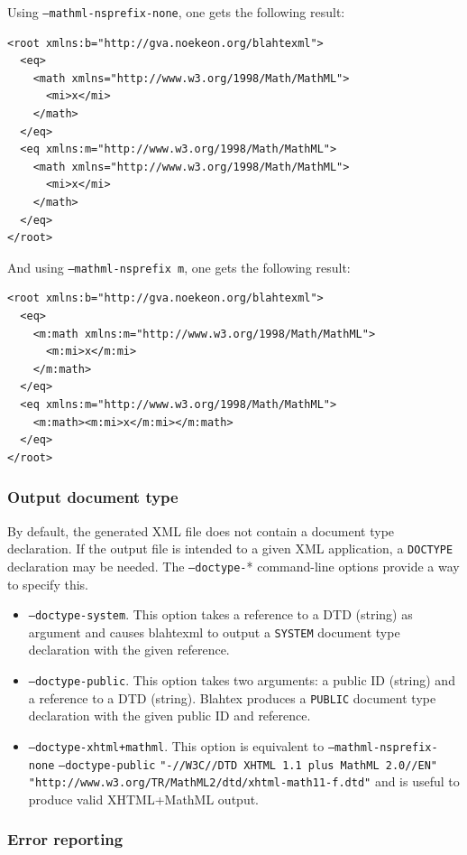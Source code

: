 \documentclass{article}
\begin{document}
Using \texttt{--mathml-nsprefix-none}, one gets the following result:
\begin{verbatim}
<root xmlns:b="http://gva.noekeon.org/blahtexml">
  <eq>
    <math xmlns="http://www.w3.org/1998/Math/MathML">
      <mi>x</mi>
    </math>
  </eq>
  <eq xmlns:m="http://www.w3.org/1998/Math/MathML">
    <math xmlns="http://www.w3.org/1998/Math/MathML">
      <mi>x</mi>
    </math>
  </eq>
</root>
\end{verbatim}

And using \texttt{--mathml-nsprefix m}, one gets the following result:
\begin{verbatim}
<root xmlns:b="http://gva.noekeon.org/blahtexml">
  <eq>
    <m:math xmlns:m="http://www.w3.org/1998/Math/MathML">
      <m:mi>x</m:mi>
    </m:math>
  </eq>
  <eq xmlns:m="http://www.w3.org/1998/Math/MathML">
    <m:math><m:mi>x</m:mi></m:math>
  </eq>
</root>
\end{verbatim}


\subsubsection{Output document type}

By default, the generated XML file does not contain a document type declaration. If the output file is intended to a given XML application, a \texttt{DOCTYPE} declaration may be needed. The \texttt{--doctype-}* command-line options provide a way to specify this.

\begin{itemize}
\item \texttt{--doctype-system}. This option takes a reference to a DTD (string) as argument and causes blahtexml to output a \texttt{SYSTEM} document type declaration with the given reference.
\item \texttt{--doctype-public}. This option takes two arguments: a public ID (string) and a reference to a DTD (string). Blahtex produces a \texttt{PUBLIC} document type declaration with the given public ID and reference.
\item \texttt{--doctype-xhtml+mathml}. This option is equivalent to \texttt{--mathml-nsprefix-none} \texttt{--doctype-public} \texttt{"-//W3C//DTD XHTML 1.1 plus MathML 2.0//EN"}
\newline
\texttt{"http://www.w3.org/TR/MathML2/dtd/xhtml-math11-f.dtd"} and is useful to produce valid XHTML+MathML output.
\end{itemize}

\subsubsection{Error reporting}
\end{document}
